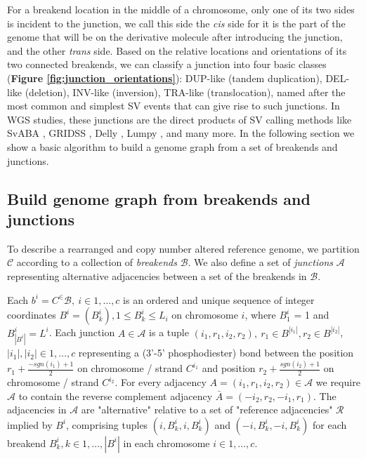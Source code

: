 \documentclass[phd,tocprelim]{cornell}
\begin{document}
For a breakend location in the middle of a chromosome, only one of its two sides is incident to the junction, we call this side the \textit{cis} side for it is the part of the genome that will be on the derivative molecule after introducing the junction, and the other \textit{trans} side. Based on the relative locations and orientations of its two connected breakends, we can classify a junction into four basic classes (\textbf{Figure \ref{fig:junction_orientations}}): DUP-like (tandem duplication), DEL-like (deletion), INV-like (inversion), TRA-like (translocation), named after the most common and simplest SV events that can give rise to such junctions. In WGS studies, these junctions are the direct products of SV calling methods like SvABA \cite{Wala2018-qa}, GRIDSS \cite{Cameron2017-pz}, Delly \cite{Rausch2012-ly}, Lumpy \cite{Layer2014-xq}, and many more. In the following section we show a basic algorithm to build a genome graph from a set of breakends and junctions.

\subsection{Build genome graph from breakends and junctions}
To describe a rearranged and copy number altered reference genome, we partition $\mathcal{C}$ according to a collection of \textit{breakends} $\mathcal{B}$. We also define a set of \textit{junctions} $\mathcal{A}$ representing alternative adjacencies between a set of the breakends in $\mathcal{B}$.




Each $b^i = C^ \in \mathcal{B},\ i \in 1,\ldots,c$ is an ordered and unique sequence of integer coordinates $B^i = (B^i_k), 1 \le B^i_k \le L_i$ on chromosome $i$, where $B^i_1$ = 1 and $B^i_{|B^i|} = L^i$.  Each junction $A \in \mathcal{A}$ is a tuple $(i_1,r_1,i_2,r_2),\ r_1 \in B^{|i_1|}, r_2 \in B^{|i_2|}$, $|i_1|, |i_2| \in  1, \ldots, c$ representing a (3'-5' phosphodiester) bond between the position $r_1 + \frac{-sgn(i_1)+1}{2}$ on chromosome / strand $C^{i_1}$ and position $r_2+\frac{sgn(i_2)+1}{2}$ on chromosome / strand $C^{i_2}$.  For every adjacency $A = (i_1,r_1,i_2,r_2) \in \mathcal{A}$ we require $\mathcal{A}$ to contain the reverse complement adjacency $\bar{A} = (-i_2,r_2, -i_1,r_1)$. The adjacencies in $\mathcal{A}$ are "alternative" relative to a set of "reference adjacencies" $\mathcal{R}$ implied by $B^i$, comprising tuples $(i, B^i_k, i, B^i_k)$ and $(-i, B^i_k, -i, B^i_k)$ for each breakend $B^i_k, k\in 1,\dots,|B^i|$ in each chromosome $i \in 1,\ldots,c$.
\end{document}

